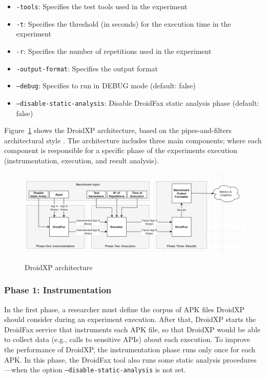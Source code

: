 \begin{itemize}
    \item \texttt{-tools}: Specifies the test tools used in the experiment
    \item \texttt{-t}: Specifies the threshold (in seconds) for the execution time in the experiment
    \item \texttt{-r}: Specifies the number of repetitions used in the experiment
    \item \texttt{-output-format}: Specifies the output format
    \item \texttt{--debug}: Specifies to run in DEBUG mode (default: false)
    \item \texttt{--disable-static-analysis}: Disable DroidFax static analysis phase (default: false)
\end{itemize}

Figure~\ref{fig:benchArq} shows the DroidXP architecture, based on the pipes-and-filters
architectural style \cite{architecture-book}. 
The architecture includes three main components; where each component is responsible for a specific phase of the
experiments execution (instrumentation, execution, and result analysis).

\begin{figure}[thb]
  \includegraphics[width=1\textwidth]{images/benchmark4.png}
  \label{benchArq}
  \caption{DroidXP architecture}
  \label{fig:benchArq}
\end{figure}

\subsubsection{Phase 1: Instrumentation}

In the first phase, a researcher must define the corpus of APK files DroidXP should consider during an
experiment execution. After that, DroidXP starts the DroidFax service that instruments each APK file,
so that DroidXP would be able to collect data (e.g., calls to sensitive APIs) about each execution.
To improve the performance of DroidXP, the instrumentation phase runs only once for each APK.
In this phase, the DroidFax tool also runs some static analysis procedures---when the
option \texttt{--disable-static-analysis} is not set.

